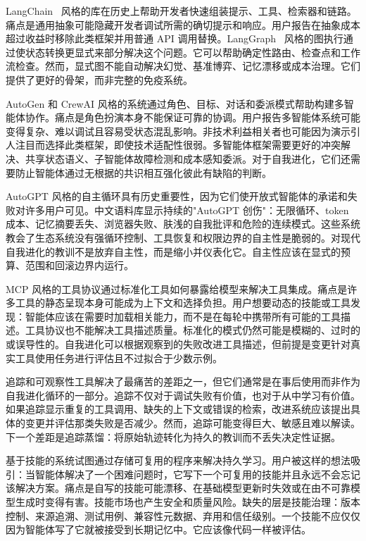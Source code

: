 LangChain~\cite{chase2023langchain} 风格的库在历史上帮助开发者快速组装提示、工具、检索器和链路。痛点是通用抽象可能隐藏开发者调试所需的确切提示和响应。用户报告在抽象成本超过收益时移除此类框架并用普通 API 调用替换。LangGraph~\cite{langgraph2024} 风格的图执行通过使状态转换更显式来部分解决这个问题。它可以帮助确定性路由、检查点和工作流检查。然而，显式图不能自动解决幻觉、基准博弈、记忆漂移或成本治理。它们提供了更好的骨架，而非完整的免疫系统。

AutoGen 和 CrewAI 风格的系统通过角色、目标、对话和委派模式帮助构建多智能体协作。痛点是角色扮演本身不能保证可靠的协调。用户报告多智能体系统可能变得复杂、难以调试且容易受状态混乱影响。非技术利益相关者也可能因为演示引人注目而选择此类框架，即使技术适配性很弱。多智能体框架需要更好的冲突解决、共享状态语义、子智能体故障检测和成本感知委派。对于自我进化，它们还需要防止智能体通过无根据的共识相互强化彼此有缺陷的判断。

AutoGPT 风格的自主循环具有历史重要性，因为它们使开放式智能体的承诺和失败对许多用户可见。中文语料库显示持续的"AutoGPT 创伤"：无限循环、token 成本、记忆摘要丢失、浏览器失败、肤浅的自我批评和危险的连续模式。这些系统教会了生态系统没有强循环控制、工具恢复和权限边界的自主性是脆弱的。对现代自我进化的教训不是放弃自主性，而是缩小并仪表化它。自主性应该在显式的预算、范围和回滚边界内运行。

MCP 风格的工具协议通过标准化工具如何暴露给模型来解决工具集成。痛点是许多工具的静态呈现本身可能成为上下文和选择负担。用户想要动态的技能或工具发现：智能体应该在需要时加载相关能力，而不是在每轮中携带所有可能的工具描述。工具协议也不能解决工具描述质量。标准化的模式仍然可能是模糊的、过时的或误导性的。自我进化可以根据观察到的失败改进工具描述，但前提是变更针对真实工具使用任务进行评估且不过拟合于少数示例。

追踪和可观察性工具解决了最痛苦的差距之一，但它们通常是在事后使用而非作为自我进化循环的一部分。追踪不仅对于调试失败有价值，也对于从中学习有价值。如果追踪显示重复的工具调用、缺失的上下文或错误的检索，改进系统应该提出具体的变更并评估那类失败是否减少。然而，追踪可能变得巨大、敏感且难以解读。下一个差距是追踪蒸馏：将原始轨迹转化为持久的教训而不丢失决定性证据。

基于技能的系统试图通过存储可复用的程序来解决持久学习。用户被这样的想法吸引：当智能体解决了一个困难问题时，它写下一个可复用的技能并且永远不会忘记该解决方案。痛点是自写的技能可能漂移、在基础模型更新时失效或在由不可靠模型生成时变得有害。技能市场也产生安全和质量风险。缺失的层是技能治理：版本控制、来源追溯、测试用例、兼容性元数据、弃用和信任级别。一个技能不应仅仅因为智能体写了它就被接受到长期记忆中。它应该像代码一样被评估。

